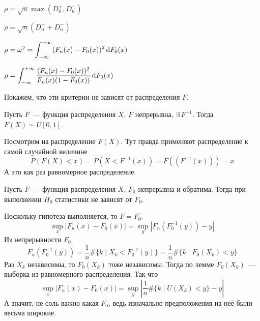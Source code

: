 \documentclass[12pt,timbord]{../../../notes}
\begin{document}
\begin{prop}\label{prop:stat::nonparcrit::smir}
  $\rho = \sqrt n\max (D_n^+, D_n^-)$
\end{prop}
\begin{prop}\label{prop:stat::nonparcrit::koyg}
  $\rho = \sqrt n(D_n^+ + D_n^-)$
\end{prop}
\begin{prop}\label{prop:stat::nonparcrit::omega}
  $\rho = \omega^2  = \displaystyle\int_{-\infty}^{+\infty} (F_n(x) - F_0(x))^2 \, \mathrm{d} F_0(x)$
\end{prop}
\begin{prop}\label{prop:stat::nonparcrit::andar}
  $\rho =  \displaystyle\int_{-\infty}^{+\infty} \frac{(F_n(x) - F_0(x))^2}{F_n(x) (1-F_0(x))} \, \mathrm{d} F_0(x)$
\end{prop}

Покажем, что эти критерии не зависят от распределения $F$.

\begin{lem}\label{lem:stat::nonparcrit::indepuni}
  Пусть $F$~--- функция распределения $X$, $F$ непрерывна, $\exists\, F^{-1}$. Тогда $F(X) \sim U[0,1]$.
\end{lem}
\begin{itlproof}
  Посмотрим на распределение $F(X)$. Тут правда применяют распределение к самой случайной величине
  \[
    P(F(X) < x) = P(X < F^{-1}(x)) = F((F^{-1}(x))) = x
  \]
  А  это как раз равномерное распределение.
\end{itlproof}

\begin{thrm}\label{thrm:lem:stat::nonparcrit::indep}
  Пусть $F$~--- функция распределения $X$, $F_0$ непрерывна и обратима. Тогда при выполнении $H_0$ статистики не зависят от $F_0$.
\end{thrm}
\begin{ittproof}
  Поскольку гипотеза выполняется, то $F= F_0$.
  \[
    \sup_x |F_n(x) - F_0(x) | = \sup_y | F_n(F_0^{-1}(y)) - y |
  \]
  Из непрерывности $F_0$
  \[
    F_n(F_0^{-1} (y)) = \frac 1 n \# \{k \mid X_k < F_0^{-1} (y)\} = \frac 1 n \# \{k \mid F_0(X_k) < y\}
  \]
  Раз $X_k$ независимы, то $F_0(X_k)$ тоже независимы. Тогда по лемме $F_0(X_k)$~--- выборка из
  равномерного распределения. Так что
   \[
    \sup_x |F_n(x) - F_0(x) | = \sup_y | \frac 1 n \# \{k \mid U(X_k) < y\} - y |
  \]
  А значит, не соль важно какая $F_0$, ведь изначально предположения на неё были весьма широкие.
\end{ittproof}
\end{document}
